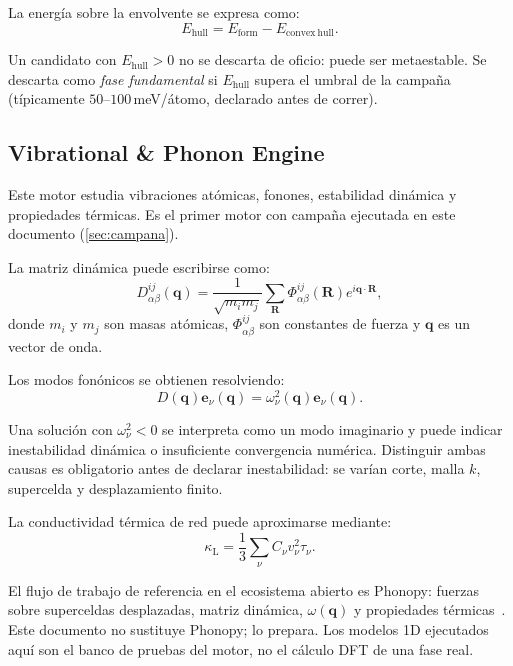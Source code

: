 \documentclass[11pt,a4paper]{article}
\newcommand{\Eform}{E_{\mathrm{form}}}
\newcommand{\Ehull}{E_{\mathrm{hull}}}
\begin{document}
La energía sobre la envolvente se expresa como:
\begin{equation}
\Ehull =
\Eform
-
E_{\mathrm{convex\ hull}}.
\end{equation}

Un candidato con $\Ehull>0$ no se descarta de oficio: puede ser metaestable. Se descarta como \emph{fase fundamental} si $\Ehull$ supera el umbral de la campaña (típicamente $50$--$100$\,meV/átomo, declarado antes de correr).

\subsection{Vibrational \& Phonon Engine}
\label{sec:vibengine}

Este motor estudia vibraciones atómicas, fonones, estabilidad dinámica y propiedades térmicas. Es el primer motor con campaña ejecutada en este documento (\cref{sec:campana}).

La matriz dinámica puede escribirse como:
\begin{equation}
D_{\alpha\beta}^{ij}(\mathbf{q}) =
\frac{1}{\sqrt{m_i m_j}}
\sum_{\mathbf{R}}
\Phi_{\alpha\beta}^{ij}(\mathbf{R})
e^{i\mathbf{q}\cdot\mathbf{R}},
\label{eq:dynmat}
\end{equation}
donde $m_i$ y $m_j$ son masas atómicas, $\Phi_{\alpha\beta}^{ij}$ son constantes de fuerza y $\mathbf{q}$ es un vector de onda.

Los modos fonónicos se obtienen resolviendo:
\begin{equation}
D(\mathbf{q})\mathbf{e}_{\nu}(\mathbf{q})
=
\omega_{\nu}^{2}(\mathbf{q})\mathbf{e}_{\nu}(\mathbf{q}).
\label{eq:phono}
\end{equation}

Una solución con $\omega_{\nu}^{2}<0$ se interpreta como un modo imaginario y puede indicar inestabilidad dinámica o insuficiente convergencia numérica. Distinguir ambas causas es obligatorio antes de declarar inestabilidad: se varían corte, malla $k$, supercelda y desplazamiento finito.

La conductividad térmica de red puede aproximarse mediante:
\begin{equation}
\kappa_{\mathrm{L}}
=
\frac{1}{3}
\sum_{\nu}
C_{\nu}
v_{\nu}^{2}
\tau_{\nu}.
\label{eq:kappa}
\end{equation}

El flujo de trabajo de referencia en el ecosistema abierto es Phonopy: fuerzas sobre superceldas desplazadas, matriz dinámica, $\omega(\mathbf{q})$ y propiedades térmicas~\cite{phonopy,phonopy_workflow}. Este documento no sustituye Phonopy; lo prepara. Los modelos 1D ejecutados aquí son el banco de pruebas del motor, no el cálculo DFT de una fase real.
\end{document}
